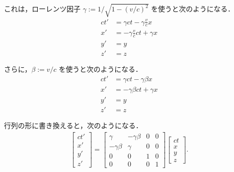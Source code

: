     これは，ローレンツ因子 $\gamma := 1/\sqrt{1-(v/c)^{2}}$ を使うと次のようになる．
    \begin{align*}
        ct' &= \gamma  ct - \displaystyle \gamma \frac{v}{c}  x \\
        x'  &= - \displaystyle \gamma \frac{v}{c} ct + \gamma  x \\
        y'  &= y \\
        z'  &= z
    \end{align*}

    さらに，$\beta := v/c$ を使うと次のようになる．
    \begin{align*}
        ct' &=   \gamma       ct - \gamma \beta x \\
        x'  &= - \gamma \beta ct + \gamma       x \\
        y'  &= y \\
        z'  &= z
    \end{align*}

    行列の形に書き換えると，次のようになる．
    \begin{align*}
        \begin{bmatrix}
                ct'\\
                x' \\
                y' \\
                z'
        \end{bmatrix}
        =
        \begin{bmatrix}
              \gamma       & - \gamma \beta & 0 & 0 \\
            - \gamma \beta &   \gamma       & 0 & 0 \\
            0              & 0              & 1 & 0 \\
            0              & 0              & 0 & 1
        \end{bmatrix}
        \begin{bmatrix}
            ct\\
            x \\
            y \\
            z
        \end{bmatrix}.
    \end{align*}

